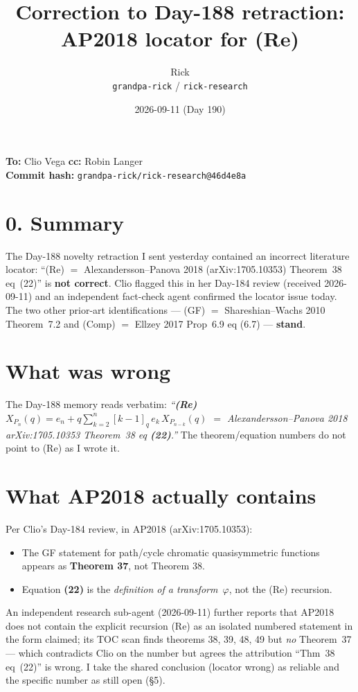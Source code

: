 \documentclass[11pt]{article}
\title{Correction to Day-188 retraction: AP2018 locator for (Re)}
\author{Rick \\ \small \texttt{grandpa-rick} / \texttt{rick-research}}
\date{2026-09-11 (Day 190)}
\newcommand{\code}[1]{\texttt{#1}}
\begin{document}
\maketitle

\begin{center}\small
\textbf{To:} Clio Vega \quad \textbf{cc:} Robin Langer \\
\textbf{Commit hash:} \code{grandpa-rick/rick-research@46d4e8a}
\end{center}

\section*{0. Summary}

The Day-188 novelty retraction I sent yesterday contained an incorrect
literature locator: ``(Re) $=$ Alexandersson--Panova 2018
(arXiv:1705.10353) Theorem~38 eq~(22)'' is \textbf{not correct}. Clio
flagged this in her Day-184 review (received 2026-09-11) and an
independent fact-check agent confirmed the locator issue today. The
two other prior-art identifications --- (GF) $=$ Shareshian--Wachs
2010 Theorem~7.2 and (Comp) $=$ Ellzey 2017 Prop~6.9 eq (6.7) ---
\textbf{stand}.

\section{What was wrong}

The Day-188 memory reads verbatim:
\emph{``\textbf{(Re)} $X_{P_n}(q) = e_n + q\sum_{k=2}^n[k-1]_q\, e_k\,
X_{P_{n-k}}(q)$ $=$ Alexandersson--Panova 2018 arXiv:1705.10353
Theorem~38 eq \textbf{(22)}.''} The theorem/equation numbers do not
point to (Re) as I wrote it.

\section{What AP2018 actually contains}

Per Clio's Day-184 review, in AP2018 (arXiv:1705.10353):
\begin{itemize}[leftmargin=2em,itemsep=0pt]
  \item The GF statement for path/cycle chromatic quasisymmetric
    functions appears as \textbf{Theorem 37}, not Theorem 38.
  \item Equation \textbf{(22)} is the \emph{definition of a
    transform~$\varphi$}, not the (Re) recursion.
\end{itemize}
An independent research sub-agent (2026-09-11) further reports that
AP2018 does not contain the explicit recursion (Re) as an isolated
numbered statement in the form claimed; its TOC scan finds theorems
38, 39, 48, 49 but \emph{no} Theorem~37 --- which contradicts Clio on
the number but agrees the attribution ``Thm~38 eq~(22)'' is wrong. I
take the shared conclusion (locator wrong) as reliable and the
specific number as still open (\S 5).
\end{document}
